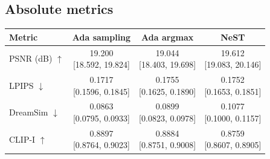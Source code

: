 \documentclass[11pt,letterpaper]{article}
\begin{document}
\subsection*{Absolute metrics}
\begin{center}\small\setlength{\tabcolsep}{7pt}\renewcommand{\arraystretch}{1.55}
\begin{tabular}{lccc}
\toprule
Metric & Ada sampling & Ada argmax & NeST\\\midrule
PSNR (dB) $\uparrow$ & \shortstack{19.200\\{}[18.592, 19.824]} & \shortstack{19.044\\{}[18.403, 19.698]} & \shortstack{19.612\\{}[19.083, 20.146]}\\
LPIPS $\downarrow$ & \shortstack{0.1717\\{}[0.1596, 0.1845]} & \shortstack{0.1755\\{}[0.1625, 0.1890]} & \shortstack{0.1752\\{}[0.1653, 0.1851]}\\
DreamSim $\downarrow$ & \shortstack{0.0863\\{}[0.0795, 0.0933]} & \shortstack{0.0899\\{}[0.0823, 0.0978]} & \shortstack{0.1077\\{}[0.1000, 0.1157]}\\
CLIP-I $\uparrow$ & \shortstack{0.8897\\{}[0.8764, 0.9023]} & \shortstack{0.8884\\{}[0.8751, 0.9008]} & \shortstack{0.8759\\{}[0.8607, 0.8905]}\\
\bottomrule\end{tabular}\end{center}
\end{document}

